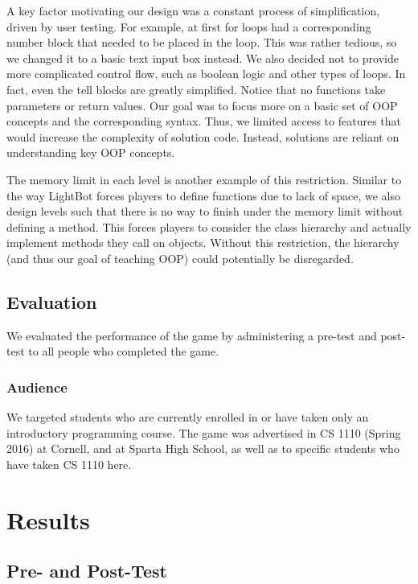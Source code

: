 \documentclass[12pt,notitlepage]{article}
\begin{document}
A key factor motivating our design was a constant process of
simplification, driven by user testing. For example, at first for
loops had a corresponding number block that needed to be placed in the
loop. This was rather tedious, so we changed it to a basic text input
box instead. We also decided not to provide more complicated control
flow, such as boolean logic and other types of loops. In fact, even
the tell blocks are greatly simplified. Notice that no functions take
parameters or return values. Our goal was to focus more on a basic set
of OOP concepts and the corresponding syntax. Thus, we limited access
to features that would increase the complexity of solution
code. Instead, solutions are reliant on understanding key OOP
concepts.

The memory limit in each level is another example of this
restriction. Similar to the way LightBot forces players to define
functions due to lack of space, we also design levels such that there
is no way to finish under the memory limit without defining a
method. This forces players to consider the class hierarchy and
actually implement methods they call on objects. Without this
restriction, the hierarchy (and thus our goal of teaching OOP) could
potentially be disregarded.

\subsection{Evaluation}

We evaluated the performance of the game by administering a pre-test
and post-test to all people who completed the game.

\subsubsection{Audience}

We targeted students who are currently enrolled in or have taken only
an introductory programming course. The game was advertised in CS 1110
(Spring 2016) at Cornell, and at Sparta High School, as well as
to specific students who have taken CS 1110 here.

\section{Results}

\subsection{Pre- and Post-Test}
\end{document}
